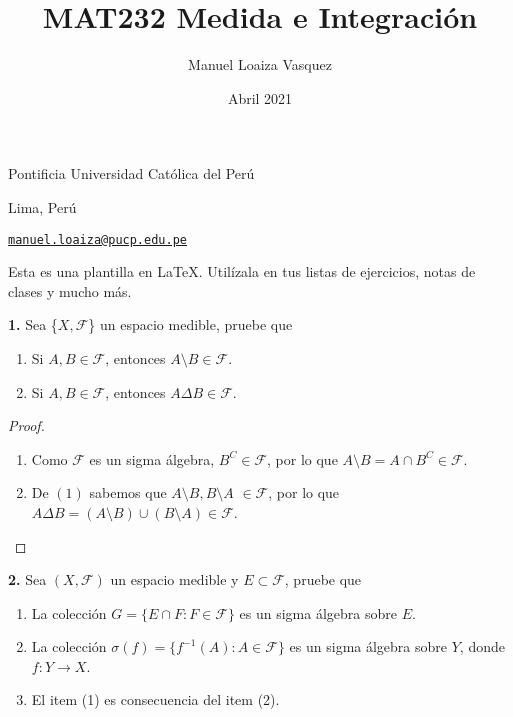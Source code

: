 \documentclass{article}
\title{MAT232 Medida e Integraci\'on}
\author{Manuel Loaiza Vasquez}
\date{Abril 2021}
\newenvironment{statement}[1]{\smallskip\noindent\color[rgb]{1.00,0.00,0.50} {\bf #1.}}{}
\theoremstyle{definition}
\theoremstyle{remark}
\begin{document}
\maketitle

\vspace*{-0.25in}
\centerline{Pontificia Universidad Cat\'olica del Per\'u}
\centerline{Lima, Per\'u}
\centerline{\href{mailto:manuel.loaiza@pucp.edu.pe}{{\tt manuel.loaiza@pucp.edu.pe}}}
\vspace*{0.15in}

\begin{framed}
  Esta es una plantilla en \LaTeX. Util\'izala en tus listas de ejercicios, notas de clases y mucho m\'as.
\end{framed}

\begin{statement}{1}
  Sea \{$X, \mathcal{F}$\} un espacio medible, pruebe que
  \begin{enumerate}
    \item Si $A, B \in \mathcal{F}$, entonces $A \setminus B \in \mathcal{F}$.
    \item Si $A, B \in \mathcal{F}$, entonces $A \Delta B \in \mathcal{F}$.
  \end{enumerate}
\end{statement}

\begin{proof}
  \begin{enumerate}
    \item Como $\mathcal{F}$ es un sigma \'algebra, $B^C \in \mathcal{F}$, por lo que $A \setminus B = A \cap B^C \in \mathcal{F}$.
    \item De $(1)$ sabemos que $A \setminus B, B \setminus A$ $\in \mathcal{F}$, por lo que $A \Delta B = (A \setminus B) \cup (B \setminus A) \in \mathcal{F}$. 
  \end{enumerate}
\end{proof}

\begin{statement}{2}
  Sea $(X, \mathcal{F})$ un espacio medible y $E \subset \mathcal{F}$, pruebe que
  \begin{enumerate}
    \item La colecci\'on $G = \{E \cap F : F \in \mathcal{F}\}$ es un sigma \'algebra sobre $E$.
    \item La colecci\'on $\sigma(f) = \{f^{-1}(A) : A \in \mathcal{F}\}$ es un sigma \'algebra sobre $Y$, donde $f: Y \to X$.
    \item El item (1) es consecuencia del item (2).
  \end{enumerate}
\end{statement}
\end{document}
